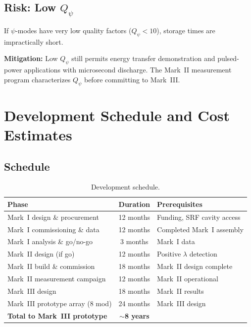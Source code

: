 \documentclass[11pt,a4paper]{article}
\begin{document}
\subsection{Risk: Low $Q_\psi$}

If $\psi$-modes have very low quality factors ($Q_\psi < 10$), storage
times are impractically short.

\textbf{Mitigation:} Low $Q_\psi$ still permits energy transfer demonstration
and pulsed-power applications with microsecond discharge.  The Mark~II
measurement program characterizes $Q_\psi$ before committing to Mark~III.

\section{Development Schedule and Cost Estimates}

\subsection{Schedule}

\begin{table}[h]
\centering
\caption{Development schedule.}
\label{tab:schedule}
\begin{tabular}{@{}lcl@{}}
\toprule
Phase & Duration & Prerequisites \\
\midrule
Mark~I design \& procurement & 12 months & Funding, SRF cavity access \\
Mark~I commissioning \& data & 12 months & Completed Mark~I assembly \\
Mark~I analysis \& go/no-go & 3 months & Mark~I data \\
Mark~II design (if go) & 12 months & Positive $\lambda$ detection \\
Mark~II build \& commission & 18 months & Mark~II design complete \\
Mark~II measurement campaign & 12 months & Mark~II operational \\
Mark~III design & 18 months & Mark~II results \\
Mark~III prototype array (8 mod) & 24 months & Mark~III design \\
\midrule
\textbf{Total to Mark~III prototype} & \textbf{$\sim$8 years} & \\
\bottomrule
\end{tabular}
\end{table}
\end{document}
